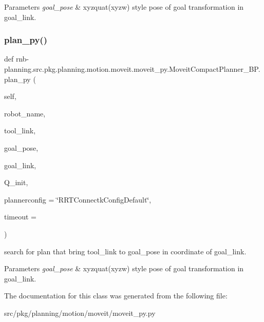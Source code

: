 \begin{DoxyParams}{Parameters}
{\em goal\+\_\+pose} & xyzquat(xyzw) style pose of goal transformation in goal\+\_\+link. \\
\hline
\end{DoxyParams}
\mbox{\label{classrnb-planning_1_1src_1_1pkg_1_1planning_1_1motion_1_1moveit_1_1moveit__py_1_1_moveit_compact_planner___b_p_af7d587144e0c713bff12b9a8adcb657f}} 
\subsubsection{\texorpdfstring{plan\+\_\+py()}{plan\_py()}}
{\footnotesize\ttfamily def rnb-\/planning.\+src.\+pkg.\+planning.\+motion.\+moveit.\+moveit\+\_\+py.\+Moveit\+Compact\+Planner\+\_\+\+B\+P.\+plan\+\_\+py (\begin{DoxyParamCaption}\item[{}]{self,  }\item[{}]{robot\+\_\+name,  }\item[{}]{tool\+\_\+link,  }\item[{}]{goal\+\_\+pose,  }\item[{}]{goal\+\_\+link,  }\item[{}]{Q\+\_\+init,  }\item[{}]{plannerconfig = {\ttfamily \char`\"{}RRTConnectkConfigDefault\char`\"{}},  }\item[{}]{timeout = {} }\end{DoxyParamCaption})}



search for plan that bring tool\+\_\+link to goal\+\_\+pose in coordinate of goal\+\_\+link. 


\begin{DoxyParams}{Parameters}
{\em goal\+\_\+pose} & xyzquat(xyzw) style pose of goal transformation in goal\+\_\+link. \\
\hline
\end{DoxyParams}


The documentation for this class was generated from the following file\+:\begin{DoxyCompactItemize}
\item 
src/pkg/planning/motion/moveit/moveit\+\_\+py.\+py\end{DoxyCompactItemize}
